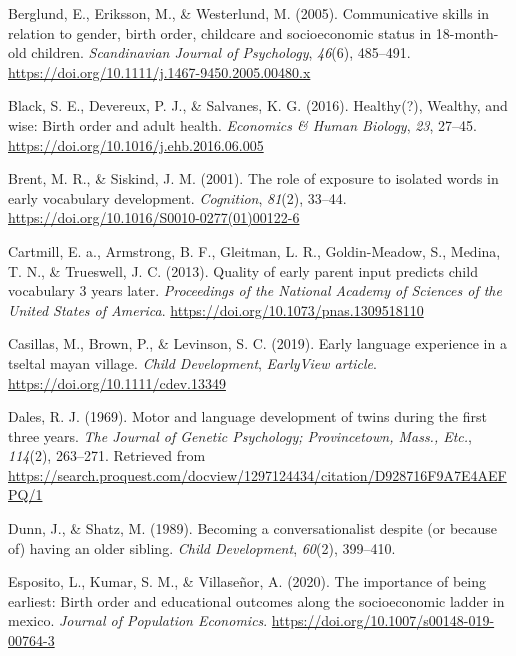 \documentclass[
  english,
  man,floatsintext]{apa6}
\newlength{\cslhangindent}
\newlength{\cslentryspacingunit} %
\newenvironment{CSLReferences}[2] %
 {%
  \setlength{\parindent}{0pt}
  \ifodd #1
  \let\oldpar\par
  \def\par{\hangindent=\cslhangindent\oldpar}
  \fi
  \setlength{\parskip}{#2\cslentryspacingunit}
 }%
 {}
\begin{document}
\begin{CSLReferences}{1}{0}
\leavevmode{}%
Berglund, E., Eriksson, M., \& Westerlund, M. (2005). Communicative skills in relation to gender, birth order, childcare and socioeconomic status in 18-month-old children. \emph{Scandinavian Journal of Psychology}, \emph{46}(6), 485--491. \url{https://doi.org/10.1111/j.1467-9450.2005.00480.x}

\leavevmode{}%
Black, S. E., Devereux, P. J., \& Salvanes, K. G. (2016). Healthy(?), Wealthy, and wise: Birth order and adult health. \emph{Economics \& Human Biology}, \emph{23}, 27--45. \url{https://doi.org/10.1016/j.ehb.2016.06.005}

\leavevmode{}%
Brent, M. R., \& Siskind, J. M. (2001). The role of exposure to isolated words in early vocabulary development. \emph{Cognition}, \emph{81}(2), 33--44. \url{https://doi.org/10.1016/S0010-0277(01)00122-6}

\leavevmode{}%
Cartmill, E. a., Armstrong, B. F., Gleitman, L. R., Goldin-Meadow, S., Medina, T. N., \& Trueswell, J. C. (2013). Quality of early parent input predicts child vocabulary 3 years later. \emph{Proceedings of the National Academy of Sciences of the United States of America}. \url{https://doi.org/10.1073/pnas.1309518110}

\leavevmode{}%
Casillas, M., Brown, P., \& Levinson, S. C. (2019). Early language experience in a tseltal mayan village. \emph{Child Development}, \emph{{EarlyView} article}. \url{https://doi.org/10.1111/cdev.13349}

\leavevmode{}%
Dales, R. J. (1969). Motor and language development of twins during the first three years. \emph{The Journal of Genetic Psychology; Provincetown, Mass., Etc.}, \emph{114}(2), 263--271. Retrieved from \url{https://search.proquest.com/docview/1297124434/citation/D928716F9A7E4AEFPQ/1}

\leavevmode{}%
Dunn, J., \& Shatz, M. (1989). Becoming a conversationalist despite (or because of) having an older sibling. \emph{Child Development}, \emph{60}(2), 399--410.

\leavevmode{}%
Esposito, L., Kumar, S. M., \& Villaseñor, A. (2020). The importance of being earliest: Birth order and educational outcomes along the socioeconomic ladder in mexico. \emph{Journal of Population Economics}. \url{https://doi.org/10.1007/s00148-019-00764-3}


\end{CSLReferences}
\end{document}
